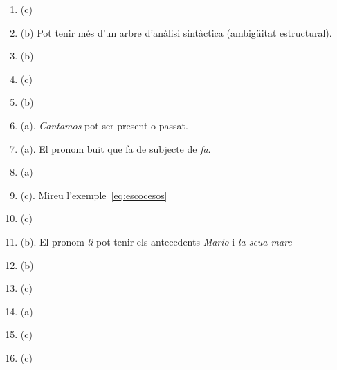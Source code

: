 \begin{enumerate}
\item (c)
\item (b) Pot tenir més d'un arbre d'anàlisi sintàctica (ambigüitat
  estructural).
\item (b)
\item (c)
\item (b)
\item (a). \emph{Cantamos} pot ser present o passat.
\item (a). El pronom buit que fa de subjecte de \emph{fa}.
\item (a)
\item (c). Mireu l'exemple~\ref{eq:escocesos}
\item (c)
\item (b). El pronom \emph{li} pot tenir els antecedents \emph{Mario}
  i \emph{la seua mare}
\item (b)
\item (c)
\item (a)
\item (c)
\item (c)

\end{enumerate}

